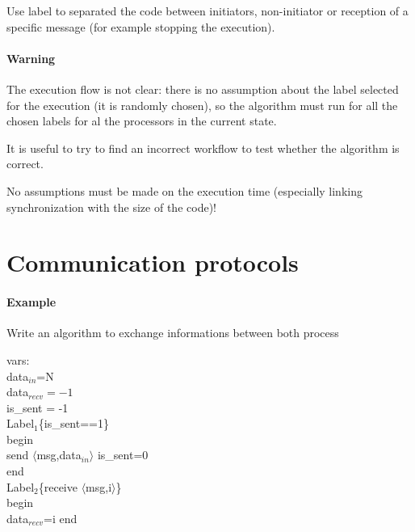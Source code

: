 \documentclass{article}
\begin{document}
Use label to separated the code between initiators, non-initiator or reception of a specific message (for example stopping the execution).

\paragraph{Warning}
The execution flow is not clear: there is no assumption about the label selected for the execution (it is randomly chosen), so the algorithm must run for all the chosen labels for al the processors in the current state.

It is useful to try to find an incorrect workflow to test whether the algorithm is correct.

No assumptions must be made on the execution time (especially linking synchronization with the size of the code)!


\section{Communication protocols}
\paragraph{Example} Write an algorithm to exchange informations between both process

\begin{algorithm}
vars:\\
data$_{in}$=N\\
data$_{recv}=-1$\\
is\_sent = -1\\
Label$_1$\{is\_sent==1\}\\
begin\\
send $\langle$msg,data$_{in}\rangle$
is\_sent=0\\
end\\
Label$_{2}$\{receive $\langle$msg,i$\rangle$\}\\
begin\\
data$_{recv}$=i
end\\
\end{algorithm}
\end{document}
